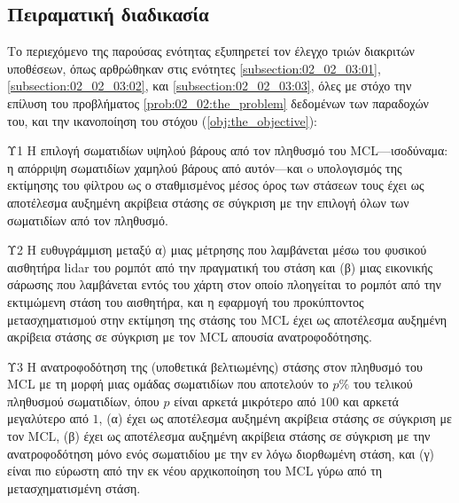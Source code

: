\subsection{Πειραματική διαδικασία}
\label{subsection:02_02_04:01}

Το περιεχόμενο της παρούσας ενότητας εξυπηρετεί τον έλεγχο τριών διακριτών
υποθέσεων, όπως αρθρώθηκαν στις ενότητες \ref{subsection:02_02_03:01},
\ref{subsection:02_02_03:02}, και \ref{subsection:02_02_03:03}, όλες με στόχο
την επίλυση του προβλήματος \ref{prob:02_02:the_problem} δεδομένων των
παραδοχών του, και την ικανοποίηση του στόχου (\ref{obj:the_objective}):

\begin{customhypothesis}{Υ1}
\label{hypothesis:02_02_04:01}
Η επιλογή σωματιδίων υψηλού βάρους από τον πληθυσμό του MCL---ισοδύναμα: η
απόρριψη σωματιδίων χαμηλού βάρους από αυτόν---και o υπολογισμός της
εκτίμησης του φίλτρου ως ο σταθμισμένος μέσος όρος των στάσεων τους έχει ως
αποτέλεσμα αυξημένη ακρίβεια στάσης σε σύγκριση με την επιλογή όλων των
σωματιδίων από τον πληθυσμό.
\end{customhypothesis}

\begin{customhypothesis}{Υ2}
\label{hypothesis:02_02_04:02}
Η ευθυγράμμιση μεταξύ α) μιας μέτρησης που λαμβάνεται μέσω του φυσικού
αισθητήρα lidar του ρομπότ από την πραγματική του στάση και (β) μιας
εικονικής σάρωσης που λαμβάνεται εντός του χάρτη στον οποίο πλοηγείται το
ρομπότ από την εκτιμώμενη στάση του αισθητήρα, και η εφαρμογή του
προκύπτοντος μετασχηματισμού στην εκτίμηση της στάσης του MCL έχει ως
αποτέλεσμα αυξημένη ακρίβεια στάσης σε σύγκριση με τον MCL απουσία
ανατροφοδότησης.
\end{customhypothesis}

\begin{customhypothesis}{Υ3}
\label{hypothesis:02_02_04:03}
Η ανατροφοδότηση της (υποθετικά βελτιωμένης) στάσης στον πληθυσμό του MCL με τη
μορφή μιας ομάδας σωματιδίων που αποτελούν το $p\%$ του τελικού πληθυσμού
σωματιδίων, όπου $p$ είναι αρκετά μικρότερο από $100$ και αρκετά μεγαλύτερο
από $1$, (α) έχει ως αποτέλεσμα αυξημένη ακρίβεια στάσης σε σύγκριση με τον
MCL, (β) έχει ως αποτέλεσμα αυξημένη ακρίβεια στάσης σε σύγκριση με την
ανατροφοδότηση μόνο ενός σωματιδίου με την εν λόγω διορθωμένη στάση, και (γ)
είναι πιο εύρωστη από την εκ νέου αρχικοποίηση του MCL γύρω από τη
μετασχηματισμένη στάση.
\end{customhypothesis}


